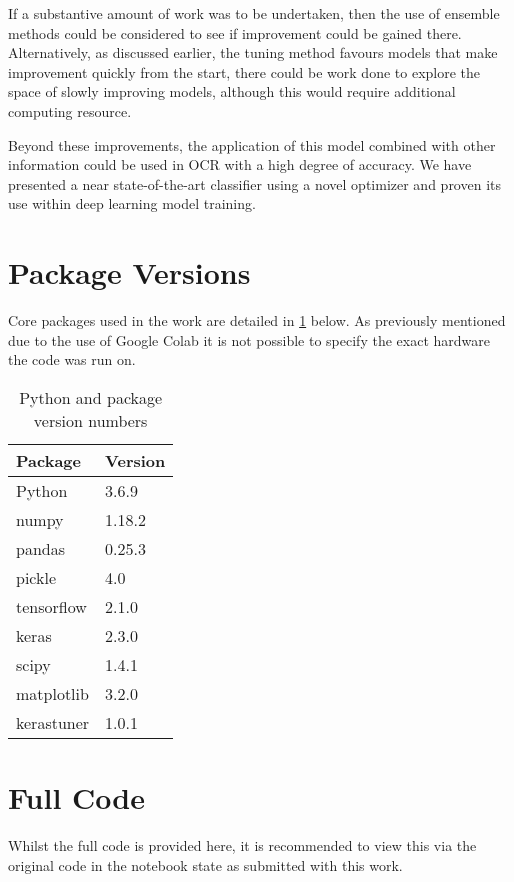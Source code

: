 \documentclass[12pt]{article}
\numberwithin{equation}{section}
\numberwithin{figure}{section}
\numberwithin{table}{section}
\begin{document}
If a substantive amount of work was to be undertaken, then the use of ensemble methods could be considered to see if improvement could be gained there. Alternatively, as discussed earlier, the tuning method favours models that make improvement quickly from the start, there could be work done to explore the space of slowly improving models, although this would require additional computing resource. 

Beyond these improvements, the application of this model combined with other information could be used in OCR with a high degree of accuracy. We have presented a near state-of-the-art classifier using a novel optimizer and proven its use within deep learning model training.
\nocite{*}

 
\appendix
\section{Package Versions}
Core packages used in the work are detailed in \cref{tab:package_vers} below. As previously mentioned due to the use of Google Colab it is not possible to specify the exact hardware the code was run on.
\begin{table}[H]
  \centering
  \begin{tabular}{|l|l|}
  \hline
  \textbf{Package} & \textbf{Version} \\ \hline
  Python           & 3.6.9            \\ \hline
  numpy            & 1.18.2           \\ \hline
  pandas           & 0.25.3           \\ \hline
  pickle           & 4.0              \\ \hline
  tensorflow       & 2.1.0            \\ \hline
  keras            & 2.3.0            \\ \hline
  scipy            & 1.4.1            \\ \hline
  matplotlib       & 3.2.0            \\ \hline
  kerastuner       & 1.0.1            \\ \hline
  \end{tabular}
  \caption{Python and package version numbers}
  \label{tab:package_vers}
  \end{table}
\section{Full Code}
Whilst the full code is provided here, it is recommended to view this via the original code in the notebook state as submitted with this work.
\end{document}
